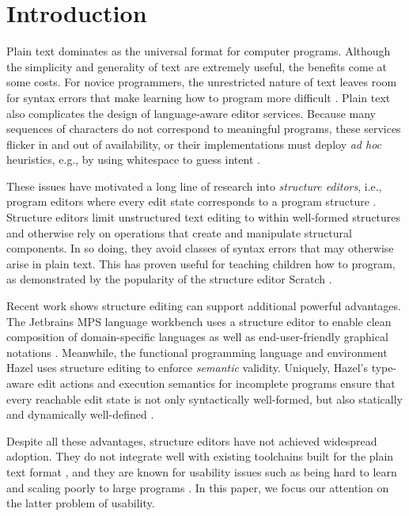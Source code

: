 \documentclass[runningheads]{llncs}
\newcommand{\Hazel}{\textsf{Hazel}\xspace}
\begin{document}
\section{Introduction}
Plain text dominates as the universal format for computer programs. Although the simplicity and generality of text are extremely useful, the benefits come at 
some costs. For novice programmers, the 
unrestricted nature of text leaves room for syntax errors that make learning how to program 
more difficult \cite{text_vs_frame}. Plain text also
complicates the design of language-aware editor services. Because many sequences of 
characters do not correspond to meaningful programs, these services flicker in and out of 
availability, or their implementations must deploy \emph{ad hoc} heuristics, e.g., by using 
whitespace to guess intent 
\cite{error_recovery_generated_parser,rapid_feedback_generated_parser}.

These issues have motivated a long line of research into \emph{structure editors}, i.e., 
program editors where every edit state corresponds to a program structure \cite{cornell}.
Structure editors limit unstructured text editing to within well-formed structures and 
otherwise rely on operations that create and manipulate structural components.
In so doing, they avoid classes of syntax errors that may otherwise arise in plain text. This 
has proven useful for teaching children how to program, as demonstrated by the popularity of 
the structure editor Scratch \cite{scratch}. 

Recent work shows structure editing can support additional powerful advantages. The Jetbrains MPS language workbench uses a structure editor to enable clean composition of domain-specific languages as well as end-user-friendly graphical notations \cite{lessons_learned_mps}. Meanwhile, the functional programming language and environment \Hazel uses structure editing to enforce \emph{semantic} validity. Uniquely, \Hazel's type-aware edit actions and execution semantics for incomplete programs ensure that every reachable edit state is not only syntactically well-formed, but also statically and dynamically well-defined \cite{hazelnut,hazelnut_live}.

Despite all these advantages, structure editors have not achieved widespread adoption. They do not integrate well with existing toolchains built for the plain text format \cite{towards_user_friendly_projectional_editors}, and they are known for usability issues such as being hard to learn \cite{towards_user_friendly_projectional_editors,efficiency_of_projectional_editing} and scaling poorly to large programs \cite{blocks_at_your_fingertips}. In this paper, we focus our attention on the latter problem of usability.
\end{document}
